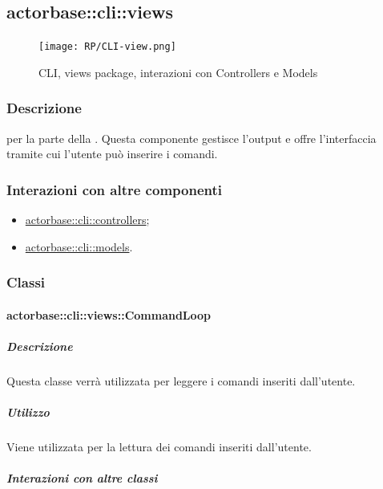 \documentclass{scalatekids-article}
\begin{document}
\subsection{actorbase::cli::views}
\label{sec:actorbase::cli::views}

\begin{figure}[H]
  \begin{center}
    \texttt{[image: RP/CLI-view.png]}
    \caption{CLI, views package, interazioni con Controllers e Models}
  \end{center}
\end{figure}

\subsubsection{Descrizione}

 per la parte  della . Questa componente
gestisce l'output e offre l'interfaccia tramite cui l'utente può inserire i
comandi.

\subsubsection{Interazioni con altre componenti}

\begin{itemize}
\item \hyperref[sec:actorbase::cli::controllers]{actorbase::cli::controllers};
\item \hyperref[sec:actorbase::cli::models]{actorbase::cli::models}.
\end{itemize}

\subsubsection{Classi}

\paragraph{actorbase::cli::views::CommandLoop}
\label{sec:actorbase::cli::views::CommandLoop}

\subparagraph{Descrizione}

Questa classe verrà utilizzata per leggere i comandi inseriti dall'utente.

\subparagraph{Utilizzo}

Viene utilizzata per la lettura dei comandi inseriti dall'utente.

\subparagraph{Interazioni con altre classi}
\end{document}

